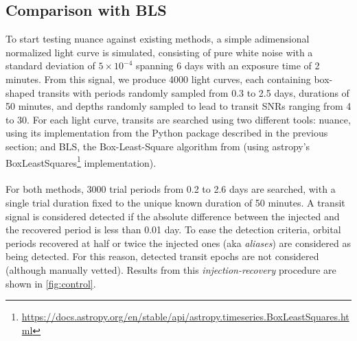 \documentclass[modern]{aastex631}
\newcommand{\nuancecode}{\textsf{nuance}}
\newcommand{\footlink}[1]{\footnote{\url{#1}}}
\begin{document}
\subsection{Comparison with BLS}\label{control}

To start testing \nuancecode{} against existing methods, a simple adimensional normalized light curve is simulated, consisting of pure white noise with a standard deviation of $5\times 10^{-4}$ spanning 6 days with an exposure time of 2 minutes.
From this signal, we produce 4000 light curves, each containing box-shaped transits with periods randomly sampled from 0.3 to 2.5 days, durations of 50 minutes, and depths randomly sampled to lead to transit SNRs ranging from 4 to 30.
For each light curve, transits are searched using two different tools: \textsf{nuance}, using its implementation from the Python package described in the previous section; and BLS, the Box-Least-Square algorithm from \cite{bls} (using \textsf{astropy}'s \textsf{BoxLeastSquares}\footlink{https://docs.astropy.org/en/stable/api/astropy.timeseries.BoxLeastSquares.html} implementation).\\\\
For both methods, 3000 trial periods from 0.2 to 2.6 days are searched, with a single trial duration fixed to the unique known duration of 50 minutes. A transit signal is considered detected if the absolute difference between the injected and the recovered period is less than 0.01 day. To ease the detection criteria, orbital periods recovered at half or twice the injected ones (aka \textit{aliases}) are considered as being detected. For this reason, detected transit epochs are not considered (although manually vetted). Results from this \textit{injection-recovery} procedure are shown in \autoref{fig:control}.
\end{document}

